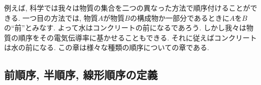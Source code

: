 
例えば, 科学では我々は物質の集合を二つの異なった方法で順序付けることができる. 一つ目の方法では, 物質$A$が物質$B$の構成物か一部分であるときに$A$を$B$の``前''とみなす. よって水はコンクリートの前になるであろう. しかし我々は物質の順序をその電気伝導率に基かせることもできる. それに従えばコンクリートは水の前になる. この章は様々な種類の順序についての章である.


\subsection{前順序, 半順序, 線形順序の定義}

